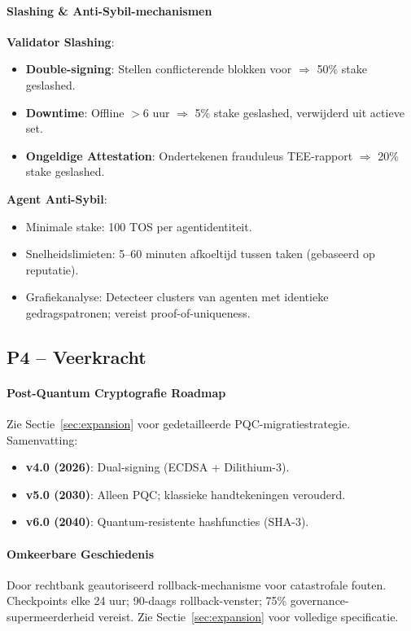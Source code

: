 \documentclass[11pt]{article}
\begin{document}
\paragraph{Slashing \& Anti-Sybil-mechanismen}
\textbf{Validator Slashing}:
\begin{itemize}[noitemsep]
  \item \textbf{Double-signing}: Stellen conflicterende blokken voor $\Rightarrow$ 50\% stake geslashed.
  \item \textbf{Downtime}: Offline $>$6 uur $\Rightarrow$ 5\% stake geslashed, verwijderd uit actieve set.
  \item \textbf{Ongeldige Attestation}: Ondertekenen frauduleus TEE-rapport $\Rightarrow$ 20\% stake geslashed.
\end{itemize}

\textbf{Agent Anti-Sybil}:
\begin{itemize}[noitemsep]
  \item Minimale stake: 100 TOS per agentidentiteit.
  \item Snelheidslimieten: 5--60 minuten afkoeltijd tussen taken (gebaseerd op reputatie).
  \item Grafiekanalyse: Detecteer clusters van agenten met identieke gedragspatronen; vereist proof-of-uniqueness.
\end{itemize}

\subsection{P4 -- Veerkracht}
\label{sec:pillar-resilience}

\paragraph{Post-Quantum Cryptografie Roadmap}
Zie Sectie~\ref{sec:expansion} voor gedetailleerde PQC-migratiestrategie. Samenvatting:
\begin{itemize}[noitemsep]
  \item \textbf{v4.0 (2026)}: Dual-signing (ECDSA + Dilithium-3).
  \item \textbf{v5.0 (2030)}: Alleen PQC; klassieke handtekeningen verouderd.
  \item \textbf{v6.0 (2040)}: Quantum-resistente hashfuncties (SHA-3).
\end{itemize}

\paragraph{Omkeerbare Geschiedenis}
Door rechtbank geautoriseerd rollback-mechanisme voor catastrofale fouten. Checkpoints elke 24 uur; 90-daags rollback-venster; 75\% governance-supermeerderheid vereist. Zie Sectie~\ref{sec:expansion} voor volledige specificatie.
\end{document}
